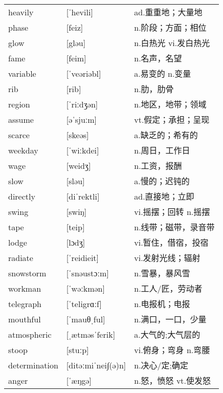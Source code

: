 \documentclass[a4paper]{article}
\begin{document}
\section{}
\begin{tabular}{l l l}

heavily & [ˈhevili] & ad.重重地；大量地 \\
phase & [feiz] & n.阶段；方面；相位 \\
glow & [gləu] & n.白热光 vi.发白热光 \\
fame & [feim] & n.名声，名望 \\
variable & [ˈveəriəbl] & a.易变的 n.变量 \\
rib & [rib] & n.肋，肋骨 \\
region & [ˈriːdʒən] & n.地区，地带；领域 \\
assume & [əˈsjuːm] & vt.假定；承担；呈现 \\
scarce & [skeəs] & a.缺乏的；希有的 \\
weekday & [ˈwiːkdei] & n.周日，工作日 \\
wage & [weidʒ] & n.工资，报酬 \\
slow & [sləu] & a.慢的；迟钝的 \\
directly & [diˈrektli] & ad.直接地；立即 \\
swing & [swiŋ] & vi.摇摆；回转 n.摇摆 \\
tape & [teip] & n.线带；磁带，录音带 \\
lodge & [lɔdʒ] & vi.暂住，借宿，投宿 \\
radiate & [ˈreidieit] & vi.发射光线；辐射 \\
snowstorm & [ˈsnəustɔːm] & n.雪暴，暴风雪 \\
workman & [ˈwəːkmən] & n.工人/匠，劳动者 \\
telegraph & [ˈteligrɑːf] & n.电报机；电报 \\
mouthful & [ˈmauθˌful] & n.满口，一口，少量 \\
atmospheric & [ˌætməsˈferik] & a.大气的;大气层的 \\
stoop & [stuːp] & vi.俯身；弯身 n.弯腰 \\
determination & [ditəːmiˈnei∫(ə)n] & n.决心/定;确定 \\
anger & [ˈæŋgə] & n.怒，愤怒 vt.使发怒 \\

\end{tabular}
\end{document}
